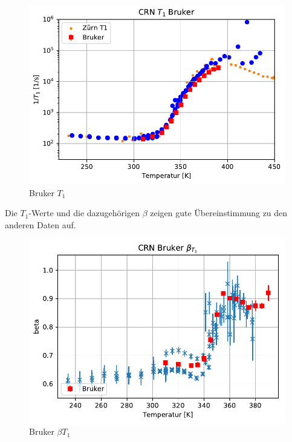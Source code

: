\begin{figure}
	\begin{center}
		\includegraphics[width=\textwidth]{graphics/plots/BRUKER/bruker_t1.pdf}
	\end{center}
	\caption{Bruker $T_1$} \label{fig:res:bruker_t1}
\end{figure}
Die $T_1$-Werte und die dazugehörigen $\beta$ zeigen gute Übereinstimmung zu den anderen Daten auf.
\begin{figure}
	\begin{center}
		\includegraphics[width=\textwidth]{graphics/plots/BRUKER/bruker_t1beta.pdf}
	\end{center}
	\caption{Bruker $\beta{T_1}$} \label{fig:res:bruker_beta_t1}
\end{figure}



